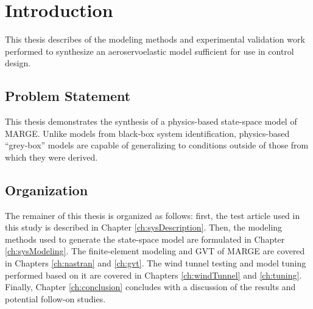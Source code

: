 \chapter{Introduction}
\label{ch:introduction}

This thesis describes of the modeling methods and experimental validation work performed to synthesize an aeroservoelastic model sufficient for use in control design.

%
%
%
%
%
%

\section{Problem Statement} %

This thesis demonstrates the synthesis of a physics-based state-space model of MARGE. Unlike models from black-box system identification, physics-based ``grey-box'' models are capable of generalizing to conditions outside of those from which they were derived.

%
%

\section{Organization} %

The remainer of this thesis is organized as follows: first, the test article used in this study is described in Chapter \ref{ch:sysDescription}. Then, the modeling methods used to generate the state-space model are formulated in Chapter \ref{ch:sysModeling}. The finite-element modeling and GVT of MARGE are covered in Chapters \ref{ch:nastran} and \ref{ch:gvt}. The wind tunnel testing and model tuning performed based on it are covered in Chapters \ref{ch:windTunnel} and \ref{ch:tuning}. Finally, Chapter \ref{ch:conclusion} concludes with a discussion of the results and potential follow-on studies.
